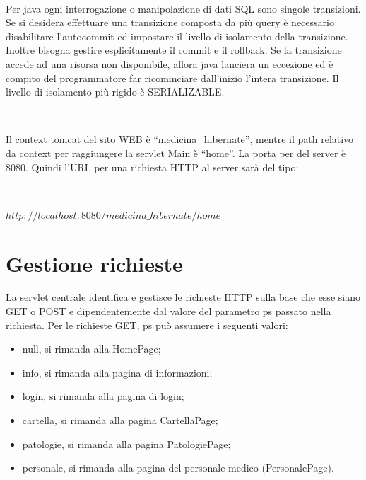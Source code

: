 \documentclass[a4paper,titlepage]{article}
\begin{document}
~

Per java ogni interrogazione o manipolazione di dati SQL sono singole transizioni. Se si desidera effettuare una transizione composta da più query è necessario disabilitare l'autocommit ed impostare il livello di isolamento della transizione. Inoltre bisogna gestire esplicitamente il commit e il rollback. Se la transizione accede ad una risorsa non disponibile, allora java lanciera un eccezione ed è compito del programmatore far ricominciare dall'inizio l'intera transizione. Il livello di isolamento più rigido è SERIALIZABLE.

~

Il context tomcat del sito WEB è ``medicina\_hibernate'', mentre il path relativo da context per raggiungere la 
servlet Main è ``home''. La porta per del server è 8080. Quindi l'URL per una richiesta HTTP al 
server sarà del tipo:

~

$http://localhost:8080/medicina\_hibernate/home$

\part{Gestione richieste}

La servlet centrale identifica e gestisce le richieste HTTP sulla base che esse siano GET o POST e 
dipendentemente dal valore del parametro ps passato nella richiesta.
Per le richieste GET, ps può assumere i seguenti valori:

\begin{itemize}[leftmargin=0.5cm, topsep=0.25cm, itemsep=0.2cm]

\item null, si rimanda alla HomePage;

\item info, si rimanda alla pagina di informazioni;

\item login, si rimanda alla pagina di login;

\item cartella, si rimanda alla pagina CartellaPage;

\item patologie, si rimanda alla pagina PatologiePage;

\item personale, si rimanda alla pagina del personale medico (PersonalePage). 

\end{itemize}
\end{document}
